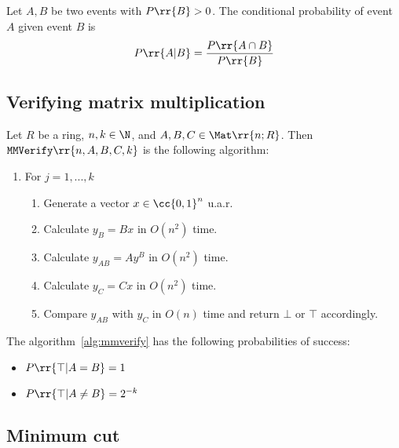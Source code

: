 \documentclass{article}
\begin{document}
\begin{definition}
  \label{def:conditiona-probability}
  Let $A,B$ be two events with $P \rr{ B } > 0$. The conditional probability
  of event $A$ given event $B$ is
  \begin{align*}
    P \rr{ A | B } = \frac{P \rr{ A \cap B }}{ P \rr{ B } }
  \end{align*}
\end{definition}


\subsection{Verifying matrix multiplication}

\begin{algorithm}\label{alg:mmverify}
  Let $R$ be a ring, $n,k\in\N$, and $A,B,C\in\Mat \rr{ n; R }$. Then
  $\texttt{MMVerify} \rr{ n, A, B, C, k }$ is the following algorithm:
  \begin{enumerate}
    \item For $j=1,...,k$ \begin{enumerate}
      \item Generate a vector $x\in \cc{ 0,1 }^n$ u.a.r.
      \item Calculate $y_B = Bx$ in $O(n^2)$ time.
      \item Calculate $y_{AB} = Ay^B$ in $O(n^2)$ time.
      \item Calculate $y_C = Cx$ in $O(n^2)$ time.
      \item Compare $y_{AB}$ with $y_C$ in $O(n)$ time and return $\bot$ or $\top$ accordingly.
    \end{enumerate}
\end{enumerate}
\end{algorithm}

\begin{theorem}
  \label{thm:mmverify-proabilities}
  The algorithm~\ref{alg:mmverify} has the following probabilities of success:
  \begin{itemize}
    \item $P \rr{ \top | A = B } = 1$
    \item $P \rr{ \top | A \not= B } = 2^{-k}$
  \end{itemize}
\end{theorem}


\subsection{Minimum cut}
\end{document}
